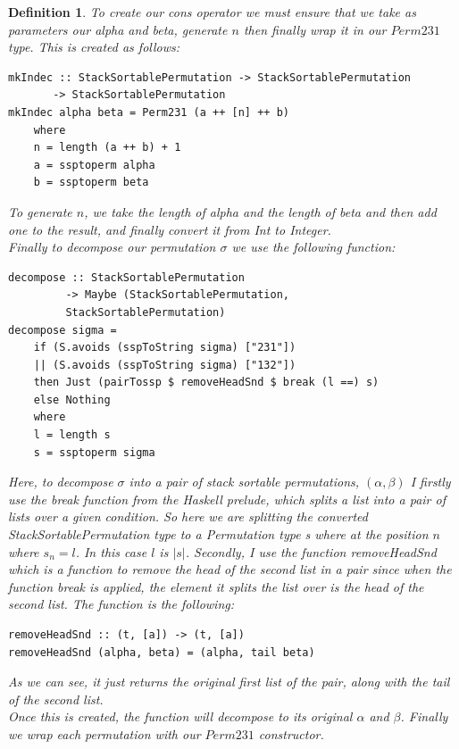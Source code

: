 \documentclass[12pt]{article}
\newtheorem{definition}{Definition}
\begin{document}
\begin{definition}
To create our cons operator we must ensure that we take as parameters our alpha and beta, generate $n$ then finally wrap it in our $Perm231$ type. This is created as follows:
\begin{lstlisting}
mkIndec :: StackSortablePermutation -> StackSortablePermutation 
	   -> StackSortablePermutation
mkIndec alpha beta = Perm231 (a ++ [n] ++ b)
	where
	n = length (a ++ b) + 1
	a = ssptoperm alpha
	b = ssptoperm beta
\end{lstlisting}
To generate $n$, we take the length of alpha and the length of beta and then add one to the result, and finally convert it from {\it Int} to {\it Integer}.\\
Finally to decompose our permutation $\sigma$ we use the following function:
\begin{lstlisting}
decompose :: StackSortablePermutation 
	     -> Maybe (StackSortablePermutation,
		 StackSortablePermutation)
decompose sigma = 
	if (S.avoids (sspToString sigma) ["231"]) 
	|| (S.avoids (sspToString sigma) ["132"])
	then Just (pairTossp $ removeHeadSnd $ break (l ==) s)
	else Nothing
	where
	l = length s
	s = ssptoperm sigma
\end{lstlisting}
Here, to decompose $\sigma$ into a pair of stack sortable permutations, $(\alpha, \beta)$ I firstly use the {\it break} function from the Haskell prelude, which splits a list into a pair of lists over a given condition. So here we are splitting the converted StackSortablePermutation type to a Permutation type s where at the position $n$ where $s_n = l$. In this case $l$ is $|s|$. Secondly, I use the function {\it removeHeadSnd} which is a function to remove the head of the second list in a pair since when the function break is applied, the element it splits the list over is the head of the second list. The function is the following:\\
\begin{lstlisting}
removeHeadSnd :: (t, [a]) -> (t, [a])
removeHeadSnd (alpha, beta) = (alpha, tail beta)
\end{lstlisting} 
As we can see, it just returns the original first list of the pair, along with the tail of the second list.\\
Once this is created, the function will decompose to its original $\alpha$ and $\beta$. Finally we wrap each permutation with our $Perm231$ constructor.


\end{definition}
\end{document}
